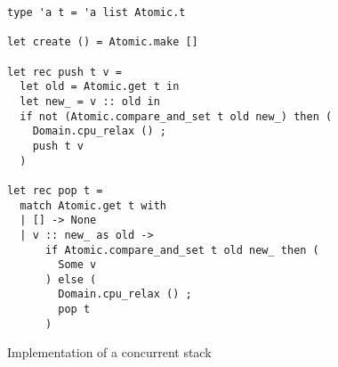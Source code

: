 \begin{figure}[t!]
\begin{verbatim}
type 'a t = 'a list Atomic.t

let create () = Atomic.make []

let rec push t v =
  let old = Atomic.get t in
  let new_ = v :: old in
  if not (Atomic.compare_and_set t old new_) then (
    Domain.cpu_relax () ;
    push t v
  )

let rec pop t =
  match Atomic.get t with
  | [] -> None
  | v :: new_ as old ->
      if Atomic.compare_and_set t old new_ then (
        Some v
      ) else (
        Domain.cpu_relax () ;
        pop t
      )
\end{verbatim}
\caption{Implementation of a concurrent stack}
\label{fig:stack}
\end{figure}

